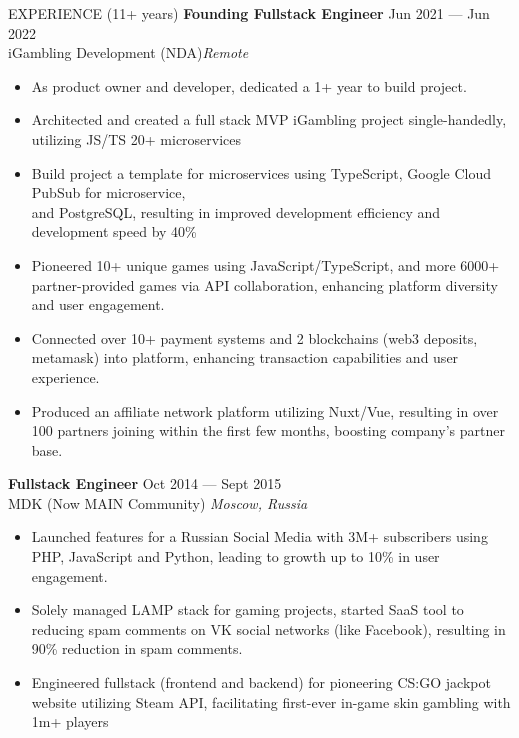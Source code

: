 \documentclass{template} %
\begin{document}
\begin{rSection}{EXPERIENCE (11+ years)}
\textbf{Founding Fullstack Engineer} \hfill Jun 2021 --- Jun 2022\\
iGambling Development (NDA)\hfill \textit{Remote}
 \begin{itemize}
    \itemsep -3pt {} 
     \item As product owner and developer, dedicated a 1+ year to build project.
     \item Architected and created a full stack MVP iGambling project single-handedly, utilizing JS/TS 20+ microservices
     \item Build project a template for microservices using TypeScript, Google Cloud PubSub for microservice,\\and PostgreSQL, resulting in improved development efficiency and development speed by 40\%
     \item Pioneered 10+ unique games using JavaScript/TypeScript, and more 6000+ partner-provided games via API collaboration, enhancing platform diversity and user engagement.
     \item Connected over 10+ payment systems and 2 blockchains (web3 deposits, metamask) into platform, enhancing transaction capabilities and user experience.
     \item Produced an affiliate network platform utilizing Nuxt/Vue, resulting in over 100 partners joining within the first few months, boosting company's partner base.
 \end{itemize}
 \textbf{Fullstack Engineer} \hfill Oct 2014 --- Sept 2015\\
MDK (Now MAIN Community) \hfill \textit{Moscow, Russia}
 \begin{itemize}
    \itemsep -3pt {} 
     \item Launched features for a Russian Social Media with 3M+ subscribers using PHP, JavaScript and Python, leading to growth up to 10\% in user engagement.
     \item Solely managed LAMP stack for gaming projects, started SaaS tool to reducing spam comments on VK social networks (like Facebook), resulting in 90\% reduction in spam comments.
     \item Engineered fullstack (frontend and backend) for pioneering CS:GO jackpot website utilizing Steam API, facilitating first-ever in-game skin gambling with 1m+ players
 \end{itemize}

\end{rSection} 

\end{document}
